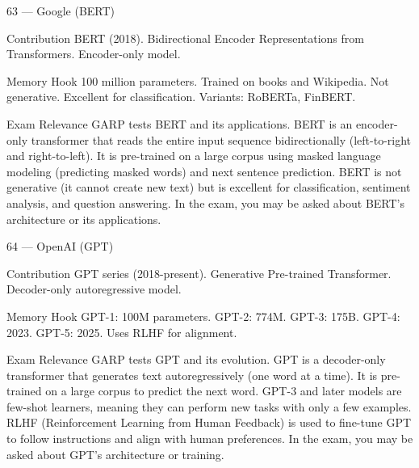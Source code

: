 \documentclass[aspectratio=169,8pt]{beamer}
\begin{document}
	\begin{frame}{63 --- Google (BERT)}
		\begin{block}{Contribution}
			BERT (2018). Bidirectional Encoder Representations from Transformers. Encoder-only model.
		\end{block}
		\begin{block}{Memory Hook}
			100 million parameters. Trained on books and Wikipedia. Not generative. Excellent for classification. Variants: RoBERTa, FinBERT.
		\end{block}
		\begin{block}{Exam Relevance}
			GARP tests BERT and its applications. BERT is an encoder-only transformer that reads the entire input sequence bidirectionally (left-to-right and right-to-left). It is pre-trained on a large corpus using masked language modeling (predicting masked words) and next sentence prediction. BERT is not generative (it cannot create new text) but is excellent for classification, sentiment analysis, and question answering. In the exam, you may be asked about BERT's architecture or its applications.
		\end{block}
	\end{frame}
	
	\begin{frame}{64 --- OpenAI (GPT)}
		\begin{block}{Contribution}
			GPT series (2018-present). Generative Pre-trained Transformer. Decoder-only autoregressive model.
		\end{block}
		\begin{block}{Memory Hook}
			GPT-1: 100M parameters. GPT-2: 774M. GPT-3: 175B. GPT-4: 2023. GPT-5: 2025. Uses RLHF for alignment.
		\end{block}
		\begin{block}{Exam Relevance}
			GARP tests GPT and its evolution. GPT is a decoder-only transformer that generates text autoregressively (one word at a time). It is pre-trained on a large corpus to predict the next word. GPT-3 and later models are few-shot learners, meaning they can perform new tasks with only a few examples. RLHF (Reinforcement Learning from Human Feedback) is used to fine-tune GPT to follow instructions and align with human preferences. In the exam, you may be asked about GPT's architecture or training.
		\end{block}
	\end{frame}
	
\end{document}
